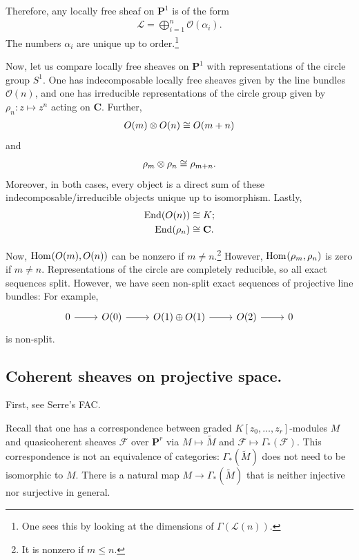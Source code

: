\documentclass [11 pt, oneside] {article}
\begin{document}
Therefore, any locally free sheaf on $\mathbf{P}^1$ is of the form
\begin{align*}
	\mathscr{L}= \bigoplus_{i=1}^n \mathscr{O}(\alpha_i).
\end{align*}
The numbers $\alpha_i$ are unique up to order.\footnote{One sees this by looking at the dimensions of $\Gamma(\mathscr{L}(n))$.}

Now, let us compare locally free sheaves on $\mathbf{P}^1$ with representations of the circle group $S^1$. One has indecomposable locally free sheaves given by the line bundles $\mathscr{O}(n)$, and one has irreducible representations of the circle group given by $\rho_n : z\longmapsto z^n$ acting on $\mathbf{C}$. Further,
\begin{align*}
	\relax{O}(m)\otimes  \relax{O}(n) \cong  \relax{O}(m+n)
\end{align*}
and
\begin{align*}
	\rho_m \otimes \rho_n \cong \rho_{m+n}.
\end{align*}
Moreover, in both cases, every object is a direct sum of these indecomposable/irreducible objects unique up to isomorphism. Lastly,
\begin{align*}
	\operatorname{End}(\relax{O}(n)) &\cong K;\\
	\operatorname{End}(\rho_n) &\cong  \mathbf{C}.
\end{align*}

Now, $\operatorname{Hom}_{}(\relax{O}(m), \relax{O}(n))$ can be nonzero if $m\ne n$.\footnote{It is nonzero if $m\le n$.} However, $\operatorname{Hom}_{}(\rho_m, \rho_n)$ is zero if $m\ne n$.
Representations of the circle are completely reducible, so all exact sequences split. However, we have seen non-split exact sequences of projective line bundles: For example,
\[
\begin{tikzcd}
	0\ar[r] & \mathscr{O}(0)\ar[r] & \mathscr{O}(1) \oplus \mathscr{O}(1)\ar[r] & \mathscr{O}(2)\ar[r]&0
\end{tikzcd}
\]
is non-split.

\subsection{Coherent sheaves on projective space.}
First, see Serre's FAC. 

Recall that one has a correspondence between graded $K[z_0,\hdots,z_r]$-modules $M$ and quasicoherent sheaves $\mathscr{F}$ over $\mathbf{P}^r$ via $M\longmapsto \tilde M$ and $\mathscr{F}\longmapsto \Gamma_*(\mathscr{F})$. This correspondence is not an equivalence of categories: $\Gamma_*(\tilde M)$ does not need to be isomorphic to $M$. There is a natural map $M\longrightarrow \Gamma_*(\tilde M)$ that is neither injective nor surjective in general. 
\end{document}
